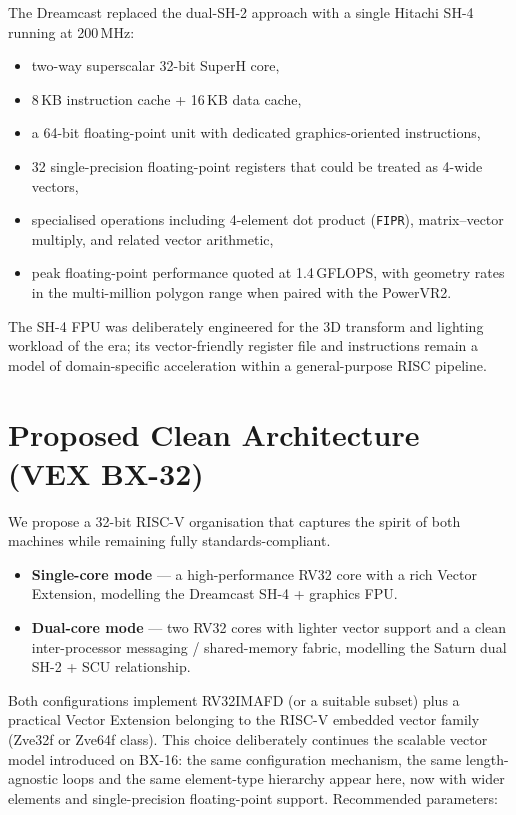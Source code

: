 \documentclass[11pt,a4paper]{article}
\begin{document}
The Dreamcast replaced the dual-SH-2 approach with a single Hitachi SH-4 running at 200\,MHz:
\begin{itemize}[leftmargin=1.5em]
  \item two-way superscalar 32-bit SuperH core,
  \item 8\,KB instruction cache + 16\,KB data cache,
  \item a 64-bit floating-point unit with dedicated graphics-oriented instructions,
  \item 32 single-precision floating-point registers that could be treated as 4-wide vectors,
  \item specialised operations including 4-element dot product (\texttt{FIPR}), matrix--vector multiply, and related vector arithmetic,
  \item peak floating-point performance quoted at 1.4\,GFLOPS, with geometry rates in the multi-million polygon range when paired with the PowerVR2.
\end{itemize}
The SH-4 FPU was deliberately engineered for the 3D transform and lighting workload of the era; its vector-friendly register file and instructions remain a model of domain-specific acceleration within a general-purpose RISC pipeline.

\section{Proposed Clean Architecture (VEX BX-32)}

We propose a 32-bit RISC-V organisation that captures the spirit of both machines while remaining fully standards-compliant.

\begin{itemize}[leftmargin=1.5em]
  \item \textbf{Single-core mode} --- a high-performance RV32 core with a rich Vector Extension, modelling the Dreamcast SH-4 + graphics FPU.
  \item \textbf{Dual-core mode} --- two RV32 cores with lighter vector support and a clean inter-processor messaging / shared-memory fabric, modelling the Saturn dual SH-2 + SCU relationship.
\end{itemize}

Both configurations implement RV32IMAFD (or a suitable subset) plus a practical Vector Extension belonging to the RISC-V embedded vector family (Zve32f or Zve64f class). This choice deliberately continues the scalable vector model introduced on BX-16: the same configuration mechanism, the same length-agnostic loops and the same element-type hierarchy appear here, now with wider elements and single-precision floating-point support. Recommended parameters:
\end{document}
